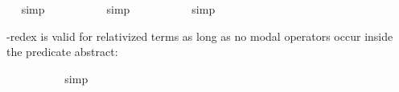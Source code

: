 \begin{isabellebody}
\isadelimproof
\ %
\endisadelimproof
%
\isatagproof
{}\isamarkupfalse%
\ simp%
\endisatagproof
{\isafoldproof}%
%
\isadelimproof
%
\endisadelimproof
\isanewline
{}\isamarkupfalse%
\ {\isachardoublequoteopen}{\isasymlfloor}{\isacharparenleft}{\isacharparenleft}{\isasymlambda}{\isasymalpha}{\isachardot}\ \isactrlbold {\isasymbox}{\isasymphi}\ {\isasymalpha}{\isacharparenright}\ {\isacharparenleft}{\isasymtau}{\isacharcolon}{\isacharcolon}{\isasymup}{\isasymzero}{\isacharparenright}{\isacharparenright}\ \isactrlbold {\isasymleftrightarrow}\ {\isacharparenleft}\isactrlbold {\isasymbox}{\isasymphi}\ {\isasymtau}{\isacharparenright}{\isasymrfloor}{\isachardoublequoteclose}%
\isadelimproof
\ %
\endisadelimproof
%
\isatagproof
{}\isamarkupfalse%
\ simp%
\endisatagproof
{\isafoldproof}%
%
\isadelimproof
%
\endisadelimproof
\isanewline
{}\isamarkupfalse%
\ {\isachardoublequoteopen}{\isasymlfloor}{\isacharparenleft}{\isacharparenleft}{\isasymlambda}{\isasymalpha}{\isachardot}\ \isactrlbold {\isasymbox}{\isasymphi}\ {\isasymalpha}{\isacharparenright}\ {\isacharparenleft}{\isasymtau}{\isacharcolon}{\isacharcolon}{\isasymzero}{\isacharparenright}{\isacharparenright}\ \isactrlbold {\isasymleftrightarrow}\ {\isacharparenleft}\isactrlbold {\isasymbox}{\isasymphi}\ {\isasymtau}{\isacharparenright}{\isasymrfloor}{\isachardoublequoteclose}%
\isadelimproof
\ %
\endisadelimproof
%
\isatagproof
{}\isamarkupfalse%
\ simp%
\endisatagproof
{\isafoldproof}%
%
\isadelimproof
%
\endisadelimproof
%
\begin{isamarkuptext}%
\isa{{\isasymbeta}{\isasymeta}}-redex is valid for relativized terms as long as no modal operators occur inside the predicate abstract:%
\end{isamarkuptext}\isamarkuptrue%
\isamarkupfalse%
\ {\isachardoublequoteopen}{\isasymlfloor}{\isacharparenleft}{\isacharparenleft}{\isasymlambda}{\isasymalpha}{\isachardot}\ {\isasymphi}\ {\isasymalpha}{\isacharparenright}\ \isactrlbold {\isasymdownharpoonleft}{\isacharparenleft}{\isasymtau}{\isacharcolon}{\isacharcolon}{\isasymup}{\isasymzero}{\isacharparenright}{\isacharparenright}\ \isactrlbold {\isasymleftrightarrow}\ {\isacharparenleft}{\isasymphi}\ \isactrlbold {\isasymdownharpoonleft}{\isasymtau}{\isacharparenright}{\isasymrfloor}{\isachardoublequoteclose}%
\isadelimproof
\ %
\endisadelimproof
%
\isatagproof
{}\isamarkupfalse%
\ simp%
\endisatagproof
{\isafoldproof}%
%
\isadelimproof
%
\endisadelimproof
%
\begin{isamarkuptext}%

\end{isamarkuptext}
\end{isabellebody}

